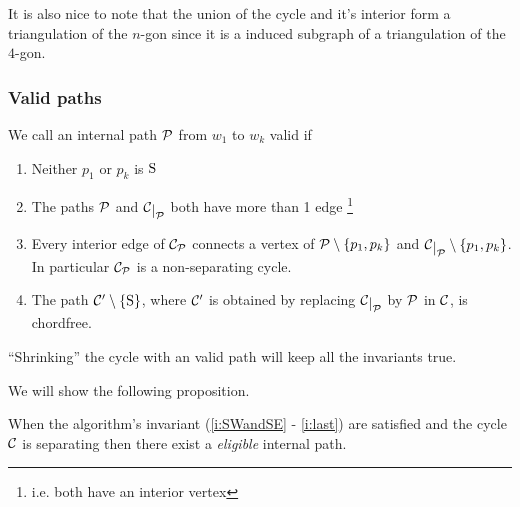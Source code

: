 It is also nice to note that the union of the cycle and it's interior form a triangulation of the $n$-gon since it is a induced subgraph of a triangulation of the $4$-gon.


\subsubsection{Valid paths}

\begin{defi}
We call an internal path $\P$ from $w_1$ to $w_k$ valid if
\begin{enumerate}
 \renewcommand*{\labelenumi}{(E\arabic{enumi})}%
 \renewcommand*{\theenumi}{(E\arabic{enumi})}%


\item Neither $p_1$ or $p_k$ is $\pS$
\label{e:noS}

\item The paths $\P$ and $\restC \P$ both have more than 1 edge \footnote{i.e. both have an interior vertex}
\label{e:longBorders}

\item Every interior edge of $\C_\P$ connects a vertex of $\P\setminus{\braces{p_1,p_k}}$ and $\restC \P \setminus{\braces{p_1,p_k}}$. In particular $\C_\P$ is a non-separating cycle.
\label{e:crossingEdges}

\item The path $\C'\sm{\pS}$, where $\C'$ is obtained by replacing $\restC \P$ by $\P$ in $\C$, is chordfree.
\label{e:noNewChord}

\end{enumerate}
\end{defi}

\begin{remark}
``Shrinking'' the cycle with an valid path will keep all the invariants true.
\end{remark}

We will show the following proposition.



\begin{thrm}
\label{th:eligExistence}
When the algorithm's invariant (\ref{i:SWandSE} - \ref{i:last}) are satisfied and the cycle $\C$ is separating then there exist a \emph{eligible} internal path.
\end{thrm}

